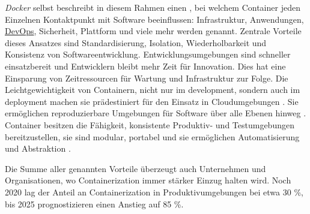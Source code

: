 \textit{Docker} selbst beschreibt in diesem Rahmen einen , bei welchem Container jeden Einzelnen Kontaktpunkt mit Software beeinflussen: Infrastruktur, Anwendungen, \hyperref[sec:03-01_introduction-to-devops]{DevOps}, Sicherheit, Plattform und viele mehr werden genannt. Zentrale Vorteile dieses Ansatzes sind Standardisierung, Isolation, Wiederholbarkeit und Konsistenz von Softwareentwicklung. Entwicklungsumgebungen sind schneller einsatzbereit und Entwicklern bleibt mehr Zeit für Innovation. Dies hat eine Einsparung von Zeitressourcen für Wartung und Infrastruktur zur Folge. \cite{016:Effectively-managing-all-of-those-Applications} Die Leichtgewichtigkeit von Containern, nicht nur im \Gls{development}, sondern auch im \Gls{deployment} machen sie prädestiniert für den Einsatz in Cloudumgebungen \cite{015:Containers-in-Software-Development,024:Investiugating-Impact-of-Containerization-on-Deployment-Process-in-DevOps,025:Exploring-Solutions-for-Container-Image-Security}. Sie ermöglichen reproduzierbare Umgebungen für Software über alle Ebenen hinweg \cite{013:Role-of-Containers-in-Reproducibility,024:Investiugating-Impact-of-Containerization-on-Deployment-Process-in-DevOps}. Container besitzen die Fähigkeit, konsistente Produktiv- und Testumgebungen bereitzustellen, sie sind modular, portabel und sie ermöglichen Automatisierung und Abstraktion \cite{014:Managing-Container-based-Software-Development-Environments}.

Die Summe aller genannten Vorteile überzeugt auch Unternehmen und Organisationen, wo Containerization immer stärker Einzug halten wird. Noch 2020 lag der Anteil an Containerization in Produktivumgebungen bei etwa 30 \%, bis 2025 prognostizieren \citeauthor{020:Assessing-and-Improving-Quality-of-Docker-Artifacts} einen Anstieg auf 85 \%. \cite{020:Assessing-and-Improving-Quality-of-Docker-Artifacts}
